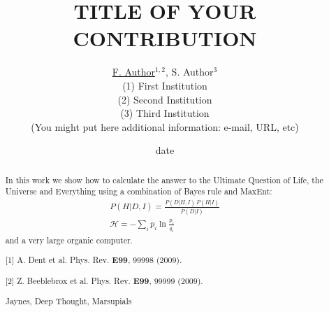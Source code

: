 \documentclass[letterpaper,12pt]{article}
\begin{document}
\title{TITLE OF YOUR CONTRIBUTION}

\author{\underline{F. Author}$^{1,2}$, S. Author$^{3}$\\
        (1) First Institution\\
        (2) Second Institution\\
        (3) Third Institution\\
        (You might put here additional information: e-mail,
         URL, etc)
       }

\date{date}
\maketitle

\begin{abstract}
\noindent
In this work we show how to calculate the answer to the Ultimate Question of Life, the Universe and Everything using a combination of Bayes rule and MaxEnt:
\begin{gather}
P(H|D,I) = \frac{P(D|H,I) \, P(H|I)}{P(D|I)}
\\
\mathcal{H} = - \sum_i p_i \ln \frac{p_i}{q_i}
\end{gather}
and a very large organic computer.




\medskip{}

[1] A. Dent et al. Phys. Rev. {\bf E99}, 99998 (2009).

[2] Z. Beeblebrox et al. Phys. Rev. {\bf E99}, 99999 (2009).



\medskip{}
{Jaynes, Deep Thought, Marsupials}

\end{abstract}
\thispagestyle{empty}
\end{document}
